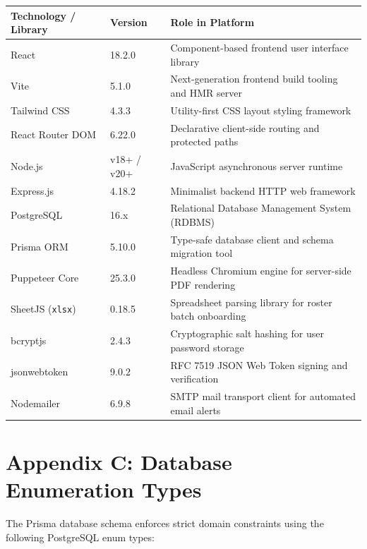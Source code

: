 \documentclass[12pt,a4paper]{report}
\begin{document}
\begin{table}[H]
\centering
\small
\begin{tabularx}{\textwidth}{@{}l l X@{}}
\toprule
\textbf{Technology / Library} & \textbf{Version} & \textbf{Role in Platform} \\
\midrule
React & 18.2.0 & Component-based frontend user interface library \\
Vite & 5.1.0 & Next-generation frontend build tooling and HMR server \\
Tailwind CSS & 4.3.3 & Utility-first CSS layout styling framework \\
React Router DOM & 6.22.0 & Declarative client-side routing and protected paths \\
Node.js & v18+ / v20+ & JavaScript asynchronous server runtime \\
Express.js & 4.18.2 & Minimalist backend HTTP web framework \\
PostgreSQL & 16.x & Relational Database Management System (RDBMS) \\
Prisma ORM & 5.10.0 & Type-safe database client and schema migration tool \\
Puppeteer Core & 25.3.0 & Headless Chromium engine for server-side PDF rendering \\
SheetJS (\texttt{xlsx}) & 0.18.5 & Spreadsheet parsing library for roster batch onboarding \\
bcryptjs & 2.4.3 & Cryptographic salt hashing for user password storage \\
jsonwebtoken & 9.0.2 & RFC 7519 JSON Web Token signing and verification \\
Nodemailer & 6.9.8 & SMTP mail transport client for automated email alerts \\
\bottomrule
\end{tabularx}
\end{table}

\section*{Appendix C: Database Enumeration Types}

The Prisma database schema enforces strict domain constraints using the following PostgreSQL enum types:
\end{document}
